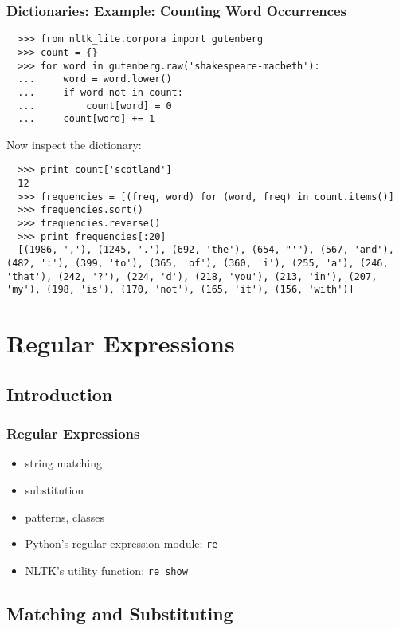 \documentclass[handout]{beamer}
\begin{document}
\begin{frame}[fragile]
\frametitle{Dictionaries: Example: Counting Word Occurrences}
\small

\begin{verbatim}
  >>> from nltk_lite.corpora import gutenberg
  >>> count = {}
  >>> for word in gutenberg.raw('shakespeare-macbeth'):
  ...     word = word.lower()
  ...     if word not in count:
  ...         count[word] = 0
  ...     count[word] += 1
\end{verbatim}

Now inspect the dictionary:

\begin{verbatim}
  >>> print count['scotland']
  12
  >>> frequencies = [(freq, word) for (word, freq) in count.items()]
  >>> frequencies.sort()
  >>> frequencies.reverse()
  >>> print frequencies[:20]
  [(1986, ','), (1245, '.'), (692, 'the'), (654, "'"), (567, 'and'), (482, ':'), (399, 'to'), (365, 'of'), (360, 'i'), (255, 'a'), (246, 'that'), (242, '?'), (224, 'd'), (218, 'you'), (213, 'in'), (207, 'my'), (198, 'is'), (170, 'not'), (165, 'it'), (156, 'with')]
\end{verbatim}
\end{frame}

\section{Regular Expressions}

\subsection{Introduction}

\begin{frame}
\frametitle{Regular Expressions}
\begin{itemize}
\item string matching
\item substitution
\item patterns, classes
\item Python's regular expression module: \texttt{re}
\item NLTK's utility function: \texttt{re\_show}
\end{itemize}
\end{frame}

\subsection{Matching and Substituting}
\end{document}
